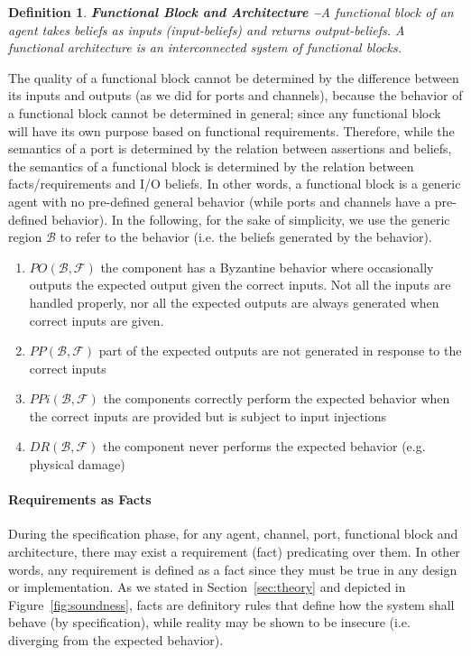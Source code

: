 \documentclass[conference]{IEEEtran}
\newcommand{\beliefRegion}{\mathcal{B}}
\newcommand{\factRegion}{\mathcal{F}}
\newcommand{\pp}[2]{PP(#1,#2)}
\newcommand{\po}[2]{PO(#1,#2)}
\newcommand{\ppi}[2]{PPi(#1,#2)}
\newcommand{\dr}[2]{DR(#1,#2)}
\newtheorem{definition}{Definition}%
\begin{document}
\begin{definition}{\bf Functional Block and Architecture --}\label{def:funblock}
	A functional block of an agent takes beliefs as  inputs (input-beliefs) and
	returns output-beliefs.  A functional architecture is an
	interconnected system of functional blocks.
\end{definition}
The quality of a functional block cannot be determined
by the difference between its inputs and outputs (as we did for
ports and channels), because the behavior of a functional block
cannot be determined in general; since any functional block will have 
its own purpose based on functional requirements. 
Therefore, while the semantics of a port is determined by the relation 
between assertions and beliefs, the semantics of a functional block 
is determined by the relation between facts/requirements and I/O beliefs.
In other words, a functional block is a generic agent with no pre-defined general
behavior (while ports and channels have a pre-defined behavior).
In the following, for the sake of simplicity, 
we use the generic region $\beliefRegion$ to refer to the behavior (i.e.
the beliefs generated by the behavior).

\begin{enumerate}[start=50, label={W\arabic*)}]
	\item $\po{\beliefRegion}{\factRegion}$ the component has a Byzantine
		behavior where occasionally outputs the expected output given
		the correct inputs. Not all the inputs are handled properly,
		nor all the expected outputs are always generated when correct
		inputs are given.
	\item $\pp{\beliefRegion}{\factRegion}$ part of the expected outputs are not
	        generated in response to the correct
	        inputs
	\item $\ppi{\beliefRegion}{\factRegion}$ the components
	        correctly perform the expected behavior when the correct
	        inputs are provided but is subject to input
	        injections
	\item $\dr{\beliefRegion}{\factRegion}$ the component
		never performs the expected behavior (e.g. physical
		damage)
\end{enumerate}

\paragraph{Requirements as Facts}
During the specification phase, for any agent, channel, port, functional block
and architecture, there may exist a requirement (fact) predicating over them.
In other words, any requirement is defined as a fact since they must be true in
any design or implementation. As we stated in Section~\ref{sec:theory} and depicted in
Figure~\ref{fig:soundness}, facts are definitory rules that define how
the system shall behave (by specification), while reality may be shown to
be insecure (i.e. diverging from the expected behavior).
\end{document}

